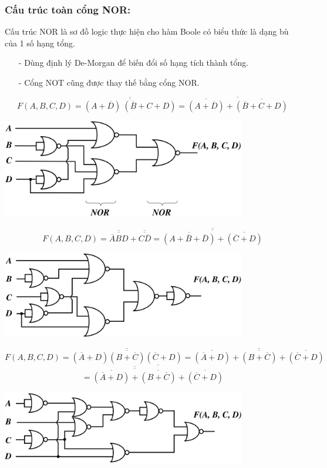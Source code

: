 \subsubsection{Cấu trúc toàn cổng NOR:}
Cấu trúc NOR là sơ đồ logic thực hiện cho hàm Boole có biểu thức là dạng bù của 1 số hạng tổng.
\begin{itemize}
    \item[-] Dùng định lý De-Morgan để biến đổi số hạng tích thành tổng.
    \item[-] Cổng NOT cũng được thay thế bằng cổng NOR.
\end{itemize}
\[
    F(A,B,C,D) = \overline{\overline{(A + \overline{D})\ (\overline{B} + C + D)}} = \overline{\overline{(A + \overline{D})} + \overline{(\overline{B} + C + D)}}
\]
\begin{center}
    \includegraphics[width = 0.8\textwidth]{./local/image/46.png}
\end{center}
\[
    F(A,B,C,D) = \overline{\overline{\overline{A}BD}} + \overline{\overline{C\overline{D}}} = \overline{\overline{\overline{(A + \overline{B} + \overline{D})} + \overline{(\overline{C} + D)}}}
\]
\begin{center}
    \includegraphics[width = 0.8\textwidth]{./local/image/47.png}
\end{center}
\[
    F(A,B,C,D) = \overline{\overline{(\overline{A} + D)(B + \overline{C})(\overline{C} + D)}} = \overline{\overline{(\overline{A} + D)} + \overline{(B + \overline{C})} + \overline{(\overline{C} + D)}} 
\]
\[
    = \overline{\overline{\overline{\overline{(\overline{A} + D)} + \overline{(B + \overline{C})}}} + \overline{(\overline{C} + D)}}
\]
\begin{center}
    \includegraphics[width = 0.8\textwidth]{./local/image/48.png}
\end{center}